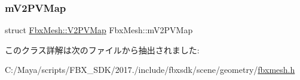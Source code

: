 \subsubsection{\texorpdfstring{m\+V2\+P\+V\+Map}{mV2PVMap}}
{\footnotesize\ttfamily struct \hyperlink{struct_fbx_mesh_1_1_v2_p_v_map}{Fbx\+Mesh\+::\+V2\+P\+V\+Map}  Fbx\+Mesh\+::m\+V2\+P\+V\+Map\hspace{0.3cm}{\ttfamily [protected]}}



このクラス詳解は次のファイルから抽出されました\+:\begin{DoxyCompactItemize}
\item 
C\+:/\+Maya/scripts/\+F\+B\+X\+\_\+\+S\+D\+K/2017./include/fbxsdk/scene/geometry/\hyperlink{fbxmesh_8h}{fbxmesh.\+h}\end{DoxyCompactItemize}
